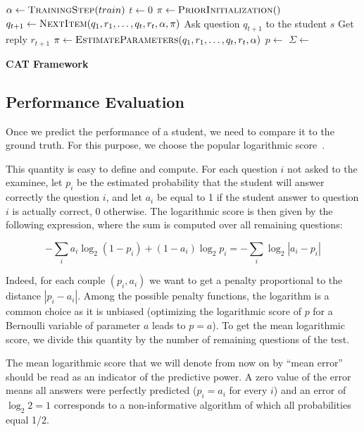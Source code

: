 \documentclass{sig-alternate}
\begin{document}
\begin{algorithm}
\begin{algorithmic}
\State $\alpha \gets \Call{TrainingStep}{train}$
\State $t \gets 0$
	\State $\pi \gets \Call{PriorInitialization}$
		\State $q_{t + 1} \gets \Call{NextItem}{q_1, r_1, \ldots, q_t, r_t, \alpha, \pi}$
		\State Ask question $q_{t + 1}$ to the student $s$
		\State Get reply $r_{t + 1}$
		\State $\pi \gets \Call{EstimateParameters}{q_1, r_1, \ldots, q_t, r_t, \alpha}$
		\State $p \gets$ 
		\State $\Sigma \gets$ 
	\EndWhile
\EndFor
\EndProcedure
\end{algorithmic}
\caption{\textbf{CAT Framework}}
\label{algo}
\end{algorithm}

\subsection{Performance Evaluation}

Once we predict the performance of a student, we need to compare it to the ground truth. For this purpose, we choose the popular logarithmic score~\cite{Gneiting2007}. 

This quantity is easy to define and compute. For each question $i$ not asked to the examinee, let $p_i$ be the estimated probability that the student will answer correctly the question $i$, and let $a_i$ be equal to 1 if the student answer to question $i$ is actually correct, 0 otherwise. The logarithmic score is then given by the following expression, where the sum is computed over all remaining questions: 

\[ - \sum_i a_i \log_2 (1 - p_i) + (1-a_i) \log_2 p_i = - \sum_i \log_2 | a_i - p_i | \]

Indeed, for each couple $(p_i, a_i)$ we want to get a penalty proportional to the distance $|p_i - a_i|$. Among the possible penalty functions, the logarithm is a common choice as it is unbiased (optimizing the logarithmic score of $p$ for a Bernoulli variable of parameter $a$ leads to $p=a$). To get the mean logarithmic score, we divide this quantity by the number of remaining questions of the test.

The mean logarithmic score that we will denote from now on by ``mean error'' should be read as an indicator of the predictive power. A zero value of the error means all answers were perfectly predicted ($p_i = a_i$ for every $i$) and an error of $\log_2 2 = 1$ corresponds to a non-informative algorithm of which all probabilities equal 1/2. 
\end{document}
